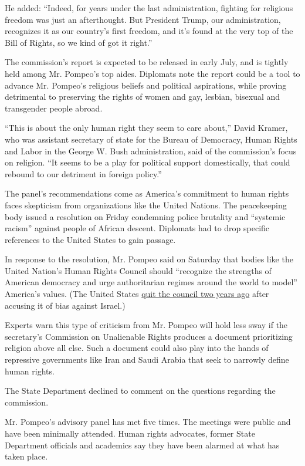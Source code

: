 He added: ``Indeed, for years under the last administration, fighting
for religious freedom was just an afterthought. But President Trump, our
administration, recognizes it as our country's first freedom, and it's
found at the very top of the Bill of Rights, so we kind of got it
right.''

The commission's report is expected to be released in early July, and is
tightly held among Mr. Pompeo's top aides. Diplomats note the report
could be a tool to advance Mr. Pompeo's religious beliefs and political
aspirations, while proving detrimental to preserving the rights of women
and gay, lesbian, bisexual and transgender people abroad.

``This is about the only human right they seem to care about,'' David
Kramer, who was assistant secretary of state for the Bureau of
Democracy, Human Rights and Labor in the George W. Bush administration,
said of the commission's focus on religion. ``It seems to be a play for
political support domestically, that could rebound to our detriment in
foreign policy.''

The panel's recommendations come as America's commitment to human rights
faces skepticism from organizations like the United Nations. The
peacekeeping body issued a resolution on Friday condemning police
brutality and ``systemic racism'' against people of African descent.
Diplomats had to drop specific references to the United States to gain
passage.

In response to the resolution, Mr. Pompeo said on Saturday that bodies
like the United Nation's Human Rights Council should ``recognize the
strengths of American democracy and urge authoritarian regimes around
the world to model'' America's values. (The United States
\href{https://www.nytimes3xbfgragh.onion/2018/06/19/us/politics/trump-israel-palestinians-human-rights.html}{quit
the council two years ago} after accusing it of bias against Israel.)

Experts warn this type of criticism from Mr. Pompeo will hold less sway
if the secretary's Commission on Unalienable Rights produces a document
prioritizing religion above all else. Such a document could also play
into the hands of repressive governments like Iran and Saudi Arabia that
seek to narrowly define human rights.

The State Department declined to comment on the questions regarding the
commission.

Mr. Pompeo's advisory panel has met five times. The meetings were public
and have been minimally attended. Human rights advocates, former State
Department officials and academics say they have been alarmed at what
has taken place.

